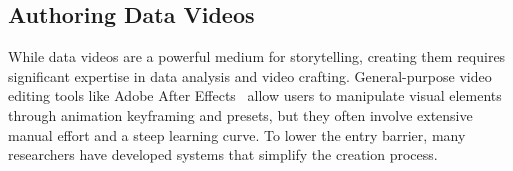 



\subsection{Authoring Data Videos}
While data videos are a powerful medium for storytelling, creating them requires significant expertise in data analysis and video crafting. General-purpose video editing tools like Adobe After Effects~\cite{} allow users to manipulate visual elements through animation keyframing and presets, but they often involve extensive manual effort and a steep learning curve. To lower the entry barrier, many researchers have developed systems that simplify the creation process.

